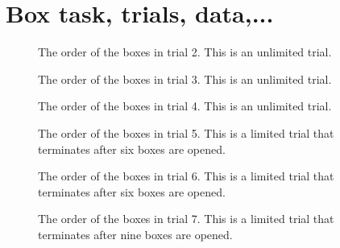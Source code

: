 \appendix
\chapter{Box task, trials, data,...}
\begin{figure}
    \centering
    \scalebox{0.8}{}
    \caption[Order of boxes in trial 2]{The order of the boxes in trial 2. This is an unlimited trial.}
    \label{fig:trial2_order_appendix}
\end{figure}

\begin{figure}
    \centering
    \scalebox{0.8}{}
    \caption[Order of boxes in trial 3]{The order of the boxes in trial 3. This is an unlimited trial.}
    \label{fig:trial3_order_appendix}
\end{figure}

\begin{figure}
    \centering
    \scalebox{0.8}{}
    \caption[Order of boxes in trial 4]{The order of the boxes in trial 4. This is an unlimited trial.}
    \label{fig:trial4_order}
\end{figure}


\begin{figure}
    \centering
    \scalebox{0.8}{}
    \caption[Order of boxes in trial 5]{The order of the boxes in trial 5. This is a limited trial that terminates after six boxes are opened.}
    \label{fig:trial5_order_appendix}
\end{figure}

\begin{figure}
    \centering
    \scalebox{0.8}{}
    \caption[Order of boxes in trial 6]{The order of the boxes in trial 6. This is a limited trial that terminates after six boxes are opened.}
    \label{fig:trial6_order}
\end{figure}

\begin{figure}
    \centering
    \scalebox{0.8}{}
    \caption[Order of boxes in trial 7]{The order of the boxes in trial 7. This is a limited trial that terminates after nine boxes are opened.}
    \label{fig:trial7_order}
\end{figure}

